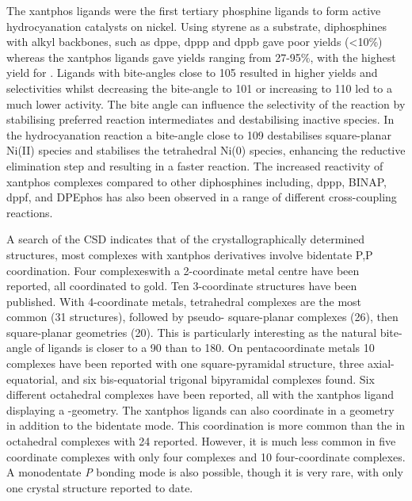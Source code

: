 The xantphos ligands were the first tertiary phosphine ligands to form active hydrocyanation catalysts on nickel.\cite{Kranenburg1995b}  Using styrene as a substrate, diphosphines with alkyl backbones, such as \gls{dppe}, \gls{dppp} and \gls{dppb} gave poor yields (\textless{}10\%) where\-as the xantphos ligands gave yields ranging from 27-95\%, with the highest yield for \Phsixantphos{}.  Ligands with bite-angles close to 105\degrees{} resulted in higher yields and selectivities whilst decreasing the bite-angle to 101\degrees{} or increasing to 110\degrees{} led to a much lower activity.  The bite angle can influence the selectivity of the reaction by stabilising preferred reaction intermediates and destabilising inactive species.   In the hydrocyanation reaction a bite-angle close to 109\degrees{} destabilises square-planar Ni(II) species and stabilises the tetrahedral Ni(0) species, enhancing the reductive elimination step and resulting in a faster reaction.\cite{Goertz1998}  The increased reactivity of xantphos complexes compared to other diphosphines including, \acrshort{dppp}, \acrshort{BINAP}, \acrshort{dppf}, and \acrshort{DPEphos} has also been observed in a range of different cross-coupling reactions.\cite{Birkholz2009}

A search of the \gls{CSD} indicates that of the crystallographically determined structures, most complexes with xantphos derivatives involve bidentate \dento{}P,P\textprime{} coordination.\cite{Allen2002}  Four complexeswith a 2-coordinate metal centre have been reported, all coordinated to gold. Ten 3-coordinate structures have been published.  With 4-coordinate metals, tetrahedral complexes are the most common (31 structures), followed by pseudo-\trans{} square-planar complexes (26), then \cis{} square-planar geometries (20).  This is particularly interesting as the natural bite-angle of \Phxantphos{} ligands is closer to a 90\degrees{} than to 180\degrees.  On pentacoordinate metals 10 complexes have been reported with one square-pyramidal structure, three axial-equatorial, and six bis-equatorial trigonal bipyramidal complexes found.  Six different octahedral complexes have been reported, all with the xantphos ligand displaying a \cis{}-geometry.  The xantphos ligands can also coordinate in a \POP{} geometry in addition to the bidentate \PP{} mode.  This \POP{} coordination is more common than the \PP{} in octahedral complexes with 24 reported.  However, it is much less common in five coordinate complexes with only four \POP{} complexes and 10 \POP{} four-coordinate complexes.  A monodentate \dento{}\emph{P} bonding mode is also possible, though it is very rare, with only one crystal structure reported to date.\cite{Escalle2009}

